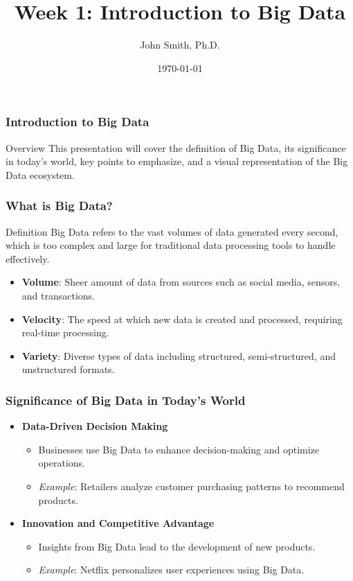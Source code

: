 \documentclass[aspectratio=169]{beamer}
\title[Week 1: Introduction to Big Data]{Week 1: Introduction to Big Data}
\author[J. Smith]{John Smith, Ph.D.}
\institute[University Name]{
  Department of Computer Science\\
  University Name\\
  \vspace{0.3cm}
  Email: email@university.edu\\
  Website: www.university.edu
}
\date{\today}
\begin{document}
\frame{\titlepage}

\begin{frame}[fragile]
    \frametitle{Introduction to Big Data}
    \begin{block}{Overview}
        This presentation will cover the definition of Big Data, its significance in today's world, key points to emphasize, and a visual representation of the Big Data ecosystem.
    \end{block}
\end{frame}

\begin{frame}[fragile]
    \frametitle{What is Big Data?}
    \begin{block}{Definition}
        Big Data refers to the vast volumes of data generated every second, which is too complex and large for traditional data processing tools to handle effectively. 
    \end{block}
    \begin{itemize}
        \item \textbf{Volume}: Sheer amount of data from sources such as social media, sensors, and transactions.
        \item \textbf{Velocity}: The speed at which new data is created and processed, requiring real-time processing.
        \item \textbf{Variety}: Diverse types of data including structured, semi-structured, and unstructured formats.
    \end{itemize}
\end{frame}

\begin{frame}[fragile]
    \frametitle{Significance of Big Data in Today's World}
    \begin{itemize}
        \item \textbf{Data-Driven Decision Making}
            \begin{itemize}
                \item Businesses use Big Data to enhance decision-making and optimize operations.
                \item \textit{Example}: Retailers analyze customer purchasing patterns to recommend products.
            \end{itemize}
        \item \textbf{Innovation and Competitive Advantage}
            \begin{itemize}
                \item Insights from Big Data lead to the development of new products.
                \item \textit{Example}: Netflix personalizes user experiences using Big Data.
            \end{itemize}
    \end{itemize}
\end{frame}
\end{document}
